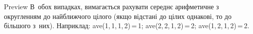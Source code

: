 {\begin{problemAllDefault}{Preview}
\noindent
В~обох випадках, вимагається рахувати середнє арифметичне з округленням до найближчого цілого (якщо відстані до цілих однакові, то до більшого з~них). Наприклад:
\mbox{ave(1,$\,$1,$\,$1,$\,$2)$\,$=$\,$1};\hspace{0.25em plus 0.125em}
\mbox{ave(2,$\,$2,$\,$1,$\,$2)$\,$=$\,$2};\hspace{0.25em plus 0.125em}
\mbox{ave(1,$\,$2,$\,$1,$\,$2)$\,$=$\,$2}.





\end{problemAllDefault}}
